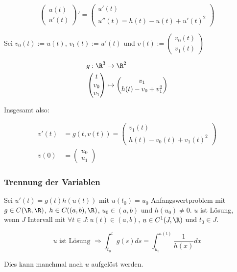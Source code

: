 $$\begin{pmatrix}u(t)\\u'(t)\end{pmatrix}' = \begin{pmatrix}u'(t)\\u''(t)=h(t)-u(t)+u'(t)^2\end{pmatrix}$$

Sei $v_0(t):=u(t)$, $v_1(t):=u'(t)$ und $v(t):=\begin{pmatrix}v_0(t)\\v_1(t)\end{pmatrix}$

\vspace*{-4mm}
\begin{align*}
	g : \R^3 &\rightarrow \R^2 \\
	\begin{pmatrix}t\\v_0\\v_1\end{pmatrix} &\mapsto \begin{pmatrix}v_1\\h(t)-v_0+v_1^2\end{pmatrix}
\end{align*}

Insgesamt also:

\vspace*{-4mm}
\begin{align*}
	v'(t)&=g(t,v(t))=\begin{pmatrix}v_1(t)\\h(t)-v_0(t)+v_1(t)^2\end{pmatrix}\\
	v(0)&=\begin{pmatrix}u_0\\u_1\end{pmatrix}
\end{align*}

\subsubsection*{Trennung der Variablen}

Sei $u'(t)=g(t)h(u(t))$ mit $u(t_0)=u_0$ Anfangswertproblem mit $g \in C(\R, \R)$, $h \in C((a, b), \R)$, $u_0 \in (a, b)$ und $h(u_0) \neq 0$. $u$ ist Lösung, wenn $J$ Intervall mit $\forall t \in J : u(t) \in (a, b)$, $u \in C^1(J, \R)$ und $t_0 \in J$.

\vspace*{-5mm}
$$u \text{ ist Lösung } \Rightarrow \int_{t_0}^t g(s) ds = \int_{u_0}^{u(t)} \frac{1}{h(x)} dx$$
\vspace*{-3mm}

Dies kann manchmal nach $u$ aufgelöst werden.
